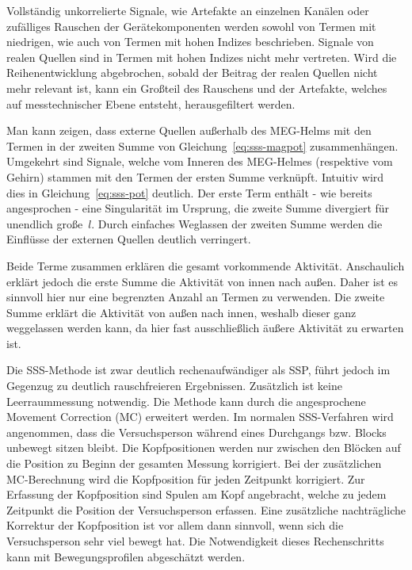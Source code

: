 \documentclass[doc,a4paper,12pt]{apa6}
\begin{document}
\begin{compactitem}
\item Vollständig unkorrelierte Signale, wie Artefakte an einzelnen Kanälen oder zufälliges Rauschen der Gerätekomponenten werden sowohl von Termen mit niedrigen, wie auch von Termen mit hohen Indizes beschrieben. Signale von realen Quellen sind in Termen mit hohen Indizes nicht mehr vertreten. Wird die Reihenentwicklung abgebrochen, sobald der Beitrag der realen Quellen nicht mehr relevant ist, kann ein Großteil des Rauschens und der Artefakte, welches auf messtechnischer Ebene entsteht, herausgefiltert werden.
\item Man kann zeigen, dass externe Quellen außerhalb des MEG-Helms mit den Termen in der zweiten Summe von Gleichung~\ref{eq:sss-magpot} zusammenhängen. Umgekehrt sind Signale, welche vom Inneren des MEG-Helmes (respektive vom Gehirn) stammen mit den Termen der ersten Summe verknüpft. Intuitiv wird dies in Gleichung~\ref{eq:sss-pot} deutlich. Der erste Term enthält - wie bereits angesprochen - eine Singularität im Ursprung, die zweite Summe divergiert für unendlich große~$l$. Durch einfaches Weglassen der zweiten Summe werden die Einflüsse der externen Quellen deutlich verringert.
\end{compactitem}

Beide Terme zusammen erklären die gesamt vorkommende Aktivität. Anschaulich erklärt jedoch die erste Summe die Aktivität von innen nach außen. Daher ist es sinnvoll hier nur eine begrenzten Anzahl an Termen zu verwenden. Die zweite Summe erklärt die Aktivität von außen nach innen, weshalb dieser ganz weggelassen werden kann, da hier fast ausschließlich äußere Aktivität zu erwarten ist.

Die SSS-Methode ist zwar deutlich rechenaufwändiger als SSP, führt jedoch im Gegenzug zu deutlich rauschfreieren Ergebnissen. Zusätzlich ist keine Leerraummessung notwendig. Die Methode kann durch die angesprochene Movement Correction (MC) erweitert werden. Im normalen SSS-Verfahren wird angenommen, dass die Versuchsperson während eines Durchgangs bzw. Blocks unbewegt sitzen bleibt. Die Kopfpositionen werden nur zwischen den Blöcken auf die Position zu Beginn der gesamten Messung korrigiert. Bei der zusätzlichen MC-Berechnung wird die Kopfposition für jeden Zeitpunkt korrigiert. Zur Erfassung der Kopfposition sind Spulen am Kopf angebracht, welche zu jedem Zeitpunkt die Position der Versuchsperson erfassen. Eine zusätzliche nachträgliche Korrektur der Kopfposition ist vor allem dann sinnvoll, wenn sich die Versuchsperson sehr viel bewegt hat. Die Notwendigkeit dieses Rechenschritts kann mit Bewegungsprofilen abgeschätzt werden.
\end{document}
